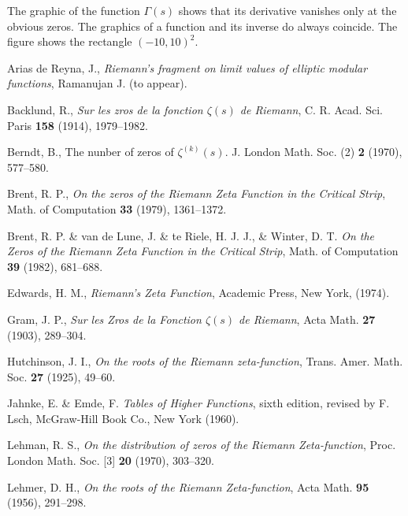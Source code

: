 \documentclass[a4paper]{amsart}
\numberwithin{equation}{section}
\begin{document}
\begin{large}



The graphic of the function $\Gamma(s)$ shows that its derivative vanishes
only at the obvious zeros. The graphics of a function and its inverse do always
coincide. The figure shows the rectangle $(-10, 10)^2$.


\end{large}



\begin{thebibliography}{9}


Arias de Reyna, J., {\em Riemann's fragment on limit values of elliptic modular functions}, 
Ramanujan J. (to appear).

Backlund, R., {\em Sur les zros de la fonction $\zeta(s)$ de 
Riemann}, C. R. Acad. Sci. Paris {\bf 158} (1914), 1979--1982.

Berndt, B., The nunber of zeros of $\zeta^{(k)}(s)$. J. London Math. 
Soc. (2) {\bf 2} (1970), 577--580.


Brent, R. P., {\em On the zeros of the Riemann Zeta Function in the 
Critical Strip}, Math. of Computation {\bf 33} (1979), 1361--1372.



Brent, R. P. \& van de Lune, J. \& te Riele, H. J. J., \& Winter, D. T.
 {\em On the Zeros of the Riemann Zeta Function in the Critical Strip}, 
 Math. of Computation {\bf 39} (1982), 681--688.
 
 Edwards, H. M., {\em Riemann's Zeta Function}, Academic Press, New 
 York, (1974).

Gram, J. P., {\em Sur les Zros de la Fonction $\zeta(s)$ de Riemann}, 
Acta Math.  {\bf 27} (1903), 289--304.

Hutchinson, J. I., {\em On the roots of the Riemann zeta-function}, 
Trans. Amer. Math. Soc.  {\bf 27} (1925), 49--60.


Jahnke, E. \&  Emde, F.  {\em Tables of Higher Functions}, sixth edition, 
revised by F. Lsch, McGraw-Hill Book Co., New York  (1960).

Lehman, R. S., {\em On the distribution of zeros of the Riemann 
Zeta-function}, Proc. London Math. Soc. [3] {\bf 20} (1970), 303--320.

Lehmer, D. H., {\em On the roots of the Riemann Zeta-function}, Acta Math. 
{\bf 95} (1956), 291--298.


\end{thebibliography}
\end{document}
